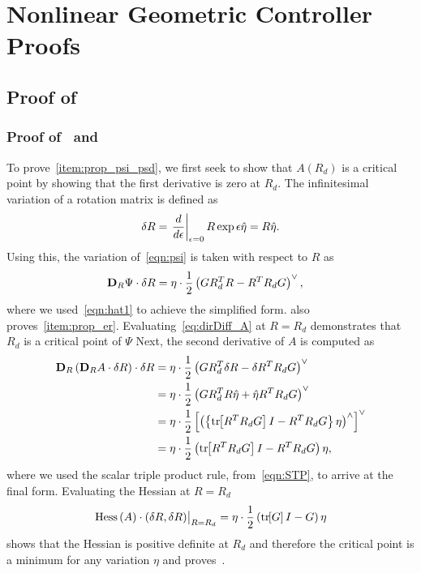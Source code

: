 \chapter{Nonlinear Geometric Controller Proofs}
\section{Proof of~}\label{proof:attitude_config_error}

\subsection{Proof of~ and~}\label{proof:prop_psi_psd}
To prove~\cref{item:prop_psi_psd}, we first seek to show that \( A(R_d) \) is a critical point by showing that the first derivative is zero at \( R_d \).
The infinitesimal variation of a rotation matrix is defined as
\begin{align*}
    \delta R = \left. \frac{d }{d \epsilon} \right|_{\epsilon=0} R \exp{\epsilon \hat{\eta}} = R \hat{\eta}.
\end{align*}
Using this, the variation of~\cref{eqn:psi} is taken with respect to \( R \) as
\begin{align}\label{eq:dirDiff_A}
	\mathbf{D}_{R} \Psi \cdot \delta R &= \eta \cdot \frac{1}{2} \left( G R_d^T R - R^T R_d G\right)^\vee ,
\end{align}
where we used~\cref{eqn:hat1} to achieve the simplified form.
 also proves~\cref{item:prop_er}.
Evaluating~\cref{eq:dirDiff_A} at \( R = R_d \) demonstrates that \( R_d \) is a critical point of \( \Psi \)
Next, the second derivative of \( A \) is computed as
\begin{align*}
    \mathbf{D}_{R} \left( \mathbf{D}_{R} A \cdot \delta R \right) \cdot \delta R &= \eta \cdot \frac{1}{2}\left( G R_d^T \delta R - \delta R^T R_d G \right)^\vee  \\
    &= \eta \cdot \frac{1}{2} \left( G R_d^T R \hat \eta + \hat \eta R^T R_d G \right)^\vee\\
    &= \eta \cdot \frac{1}{2} \left[ \left( \left\{ \mathrm{tr}\negthickspace\left[ R^T R_d G \right] I - R^T R_d G \right\} \eta \right)^\wedge \right]^\vee  \\
    &= \eta \cdot \frac{1}{2} \left( \mathrm{tr}\negthickspace\left[ R^T R_d G \right] I - R^T R_d G \right)\eta ,
\end{align*}
where we used the scalar triple product rule, from~\cref{eqn:STP}, to arrive at the final form.
Evaluating the Hessian at \( R = R_d \)
\begin{align}\label{eq:A_hessian}
    \mathrm{Hess} \, (A)\cdot (\delta R,\delta R)\big|_{R=R_d} = \eta \cdot \frac{1}{2} \left( \mathrm{tr}\negthickspace\left[ G \right]I -  G \right) \eta 
\end{align}
shows that the Hessian is positive definite at \( R_d \) and therefore the critical point is a minimum for any variation \( \eta \) and proves~\cite{item:prop_psi_psd}.

